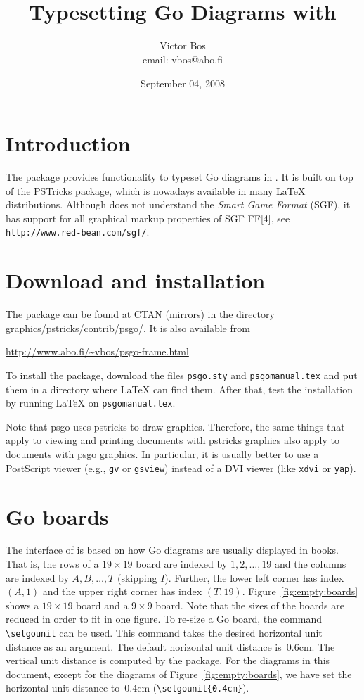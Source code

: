 \documentclass[a4paper]{article}
\title{\psgo\\{\normalfont\normalsize Typesetting Go Diagrams with \pstricks}}
\author{Victor Bos\\email: vbos@abo.fi}
\date{September 04, 2008}
\newcommand{\pstricks}{\textsf{PSTricks}}
\begin{document}
\maketitle


\section{Introduction}

The \psgo{} package provides functionality to typeset Go diagrams in
\LaTeXe. It is built on top of the \pstricks{} package, which is
nowadays available in many \LaTeX{} distributions. Although \psgo{}
does not understand the \emph{Smart Game Format} (SGF), it has support
for all graphical markup properties of SGF FF[4], see
\verb|http://www.red-bean.com/sgf/|.

\section{Download and installation}

The \psgo{} package can be found at CTAN (mirrors) in the directory
\url{graphics/pstricks/contrib/psgo/}. It is also available from

\medskip
\url{http://www.abo.fi/~vbos/psgo-frame.html}

\medskip\noindent To install the package, download the files
\texttt{psgo.sty} and \texttt{psgomanual.tex} and put them in a
directory where \LaTeX{} can find them. After that, test the
installation by running \LaTeX{} on \texttt{psgomanual.tex}. 

Note that \textsf{psgo} uses \textsf{pstricks} to draw
graphics. Therefore, the same things that apply to viewing and
printing documents with \textsf{pstricks} graphics also apply to
documents with \textsf{psgo} graphics. In particular, it is usually
better to use a PostScript viewer (e.g., \texttt{gv} or
\texttt{gsview}) instead of a DVI viewer (like \texttt{xdvi} or
\texttt{yap}).
 
\section{Go boards}

The interface of \psgo{} is based on how Go diagrams are usually
displayed in books. That is, the rows of a $19\times19$ board are
indexed by $1,2,\ldots,19$ and the columns are indexed by $A, B,
\ldots, T$ (skipping $I$). Further, the lower left corner has index
$(A, 1)$ and the upper right corner has index
$(T,19)$. Figure~\ref{fig:empty:boards} shows a $19\times 19$ board
and a $9\times9$ board. Note that the sizes of the boards are reduced
in order to fit in one figure. To re-size a Go board, the command
\verb|\setgounit| can be used. This command takes the desired
horizontal unit distance as an argument. The default horizontal unit
distance is~$0.6$cm. The vertical unit distance is computed by the
\psgo{} package. For the diagrams in this document, except for the
diagrams of Figure~\ref{fig:empty:boards}, we have set the horizontal
unit distance to~$0.4$cm (\verb|\setgounit{0.4cm}|).
\end{document}
